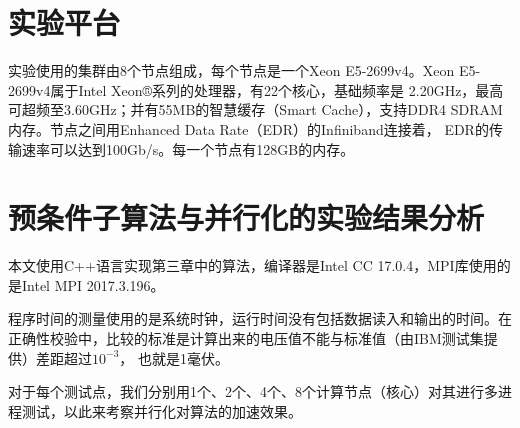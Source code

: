 \section{实验平台}

实验使用的集群由8个节点组成，每个节点是一个Xeon E5-2699v4。Xeon E5-2699v4属于Intel Xeon®系列的处理器，有22个核心，基础频率是
2.20GHz，最高可超频至3.60GHz；并有55MB的智慧缓存（Smart Cache），支持DDR4 SDRAM内存。节点之间用Enhanced Data Rate（EDR）的Infiniband连接着，
EDR的传输速率可以达到100Gb/s。每一个节点有128GB的内存。

\section{预条件子算法与并行化的实验结果分析}

本文使用C++语言实现第三章中的算法，编译器是Intel CC 17.0.4，MPI库使用的是Intel MPI 2017.3.196。

程序时间的测量使用的是系统时钟，运行时间没有包括数据读入和输出的时间。在正确性校验中，比较的标准是计算出来的电压值不能与标准值（由IBM测试集提供）差距超过$10^{-3}$，
也就是1毫伏。

对于每个测试点，我们分别用1个、2个、4个、8个计算节点（核心）对其进行多进程测试，以此来考察并行化对算法的加速效果。

